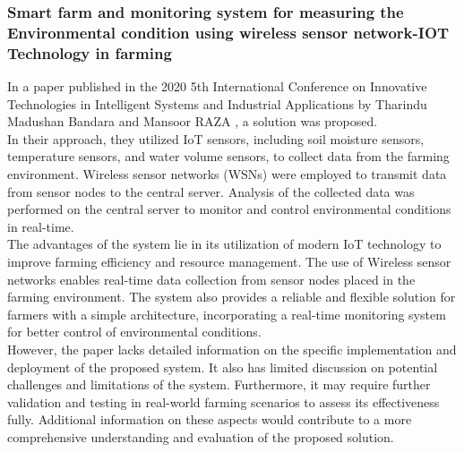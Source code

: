 \documentclass[12pt, a4paper]{article}
\begin{document}
\subsubsection{Smart farm and monitoring system for measuring the Environmental condition using wireless sensor network-IOT Technology in farming}
In a paper published in the 2020 5th International Conference on Innovative Technologies in Intelligent Systems and Industrial Applications by Tharindu Madushan Bandara and Mansoor RAZA \cite{bandara2020smart}, a solution was proposed.\\
In their approach, they utilized IoT sensors, including soil moisture sensors, temperature sensors, and water volume sensors, to collect data from the farming environment. Wireless sensor networks (WSNs) were employed to transmit data from sensor nodes to the central server. Analysis of the collected data was performed on the central server to monitor and control environmental conditions in real-time.\\
The advantages of the system lie in its utilization of modern IoT technology to improve farming efficiency and resource management. The use of Wireless sensor networks enables real-time data collection from sensor nodes placed in the farming environment. The system also provides a reliable and flexible solution for farmers with a simple architecture, incorporating a real-time monitoring system for better control of environmental conditions.\\
However, the paper lacks detailed information on the specific implementation and deployment of the proposed system. It also has limited discussion on potential challenges and limitations of the system. Furthermore, it may require further validation and testing in real-world farming scenarios to assess its effectiveness fully. Additional information on these aspects would contribute to a more comprehensive understanding and evaluation of the proposed solution.\\
\end{document}
